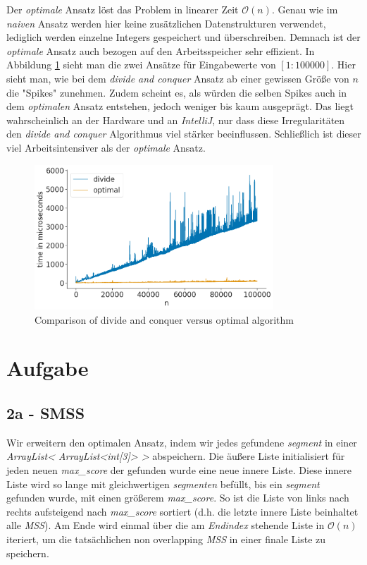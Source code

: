 \documentclass[10pt]{article}
\begin{document}
    Der \textit{optimale} Ansatz löst das Problem in linearer Zeit $\mathcal{O}(n)$. 
    Genau wie im \textit{naiven} Ansatz werden hier keine zusätzlichen Datenstrukturen verwendet,
    lediglich werden einzelne Integers gespeichert und überschreiben. Demnach ist der \textit{optimale}
    Ansatz auch bezogen auf den Arbeitsspeicher sehr effizient. 
    In Abbildung \ref{fig:compare_divide_optimal} sieht man die zwei Ansätze für Eingabewerte von $[1:100000]$.
    Hier sieht man, wie bei dem \textit{divide and conquer} Ansatz ab einer gewissen Grö\ss e von $n$
    die "Spikes" zunehmen. Zudem scheint es, als würden die selben Spikes auch in dem \textit{optimalen} Ansatz entstehen, jedoch
    weniger bis kaum ausgeprägt. Das liegt wahrscheinlich an der Hardware und an \textit{IntelliJ}, nur dass diese
    Irregularitäten den \textit{divide and conquer} Algorithmus viel stärker beeinflussen. Schlie\ss lich ist dieser viel Arbeitsintensiver als der
    \textit{optimale} Ansatz.


   \begin{figure}[ht]
       \centering
       \includegraphics[width=0.8\textwidth]{../compare_divide_optimal.png}
       \caption{Comparison of divide and conquer versus optimal algorithm}
       \label{fig:compare_divide_optimal}
   \end{figure}



\section{Aufgabe}

\subsection{2a - SMSS}\label{sec:2a}
Wir erweitern den optimalen Ansatz, indem wir jedes gefundene \textit{segment} in einer \textit{ArrayList< ArrayList<int[3]> >} abspeichern.
Die äu\ss ere Liste initialisiert für jeden neuen \textit{max\_score} der gefunden wurde eine neue innere Liste. Diese innere
Liste wird so lange mit gleichwertigen \textit{segmenten} befüllt, bis ein \textit{segment} gefunden wurde, mit einen grö\ss erem
\textit{max\_score}. So ist die Liste von links nach rechts aufsteigend nach \textit{max\_score} sortiert (d.h. die letzte innere Liste beinhaltet alle \textit{MSS}).
Am Ende wird einmal über die am \textit{Endindex} stehende Liste in $\mathcal{O}(n)$ iteriert, um die tatsächlichen non overlapping
\textit{MSS} in einer finale Liste zu speichern.
\end{document}
